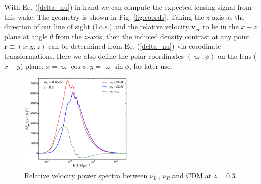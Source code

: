 \documentclass[aps,prl,twocolumn,showpacs,superscriptaddress,groupedaddress,nofootinbib]{revtex4}  %
\newcommand{\nur}{\ensuremath{{\nu_R~}}}
\newcommand{\nul}{\ensuremath{{\nu_L~}}}
\newcommand{\los}{l.o.s.}
\begin{document}
With Eq. (\ref{delta_nu}) in hand we can 
compute the expected lensing signal from this wake. The geometry 
is shown in Fig. \ref{fig:coords}.  Taking the $z$-axis
as the direction of our line of sight (\los) and the relative velocity
$\bm{v}_{\nu c}$ to lie in the $x-z$ plane at angle $\theta$ from
the $z$-axis, then the induced density contrast at any point 
$\bm{r} \equiv (x,y,z)$
can be determined from Eq. (\ref{delta_nu}) via coordinate
transformations.  Here we also define the polar coordinates $(\varpi, \phi)$ on
the lens ($x-y$) plane, $x=\varpi \cos\phi, y=\varpi \sin\phi$, for
later use.  

\begin{figure}[tbp]
  \begin{center}
    \includegraphics[width=0.48\textwidth]{fig_1.eps}
  \end{center}
  \vspace{-0.7cm}
  \caption{Relative velocity power spectra between \nul, \nur and
    CDM at $z=0.3$.}
  \label{fig:relvel}
\end{figure}
\end{document}
